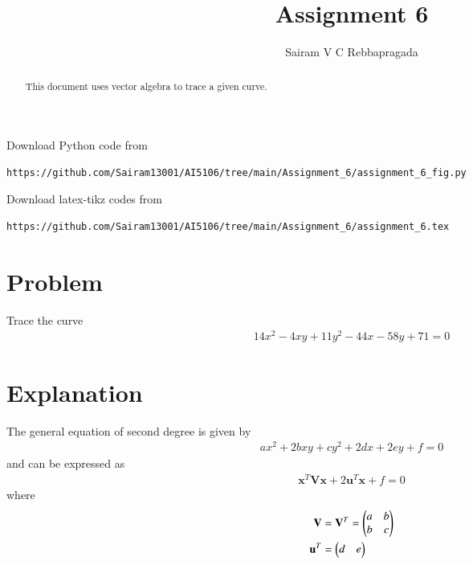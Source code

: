 \documentclass[journal,12pt,twocolumn]{IEEEtran}
\begin{document}
\makeatletter
{}
\makeatother
\let\StandardTheFigure\thefigure
\let\vec\mathbf
\renewcommand{\thefigure}{\theproblem}
\def\putbox#1#2#3{\makebox[0in][l]{\makebox[#1][l]{}\raisebox{\baselineskip}[0in][0in]{\raisebox{#2}[0in][0in]{#3}}}}
     \def\rightbox#1{\makebox[0in][r]{#1}}
     \def\centbox#1{\makebox[0in]{#1}}
     \def\topbox#1{\raisebox{-\baselineskip}[0in][0in]{#1}}
     \def\midbox#1{\raisebox{-0.5\baselineskip}[0in][0in]{#1}}
\vspace{3cm}
\title{Assignment 6}
\author{Sairam V C Rebbapragada}
\maketitle
\newpage
\bigskip
\renewcommand{\thefigure}{\theenumi}
\renewcommand{\thetable}{\theenumi}
\begin{abstract}
This document uses vector algebra to trace a given curve.
\end{abstract}
Download Python code from 
%
\begin{lstlisting}
https://github.com/Sairam13001/AI5106/tree/main/Assignment_6/assignment_6_fig.py
\end{lstlisting}
%
Download latex-tikz codes from 
%
\begin{lstlisting}
https://github.com/Sairam13001/AI5106/tree/main/Assignment_6/assignment_6.tex
\end{lstlisting}
%

\section{Problem}
Trace the curve
\begin{align}
14x^2 - 4xy + 11y^2 - 44x - 58y + 71 =0  \label{given_curve_eq}
\end{align}

\section{Explanation}

The general equation of second degree is given by
\begin{align}
ax^2+2bxy+cy^2+2dx+2ey+f=0 \label{gen_quad_eqn}
\end{align}
and can be expressed as
\begin{align}
\vec{x}^T\vec{V}\vec{x}+2\vec{u}^T\vec{x}+f=0 \label{conic_quad_eqn}
\end{align}
where
\begin{align}
\vec{V} &= \vec{V}^T = \myvec{a & b \\ b & c}
\\
\vec{u}^T &= \myvec{d & e}
\end{align}
\end{document}

